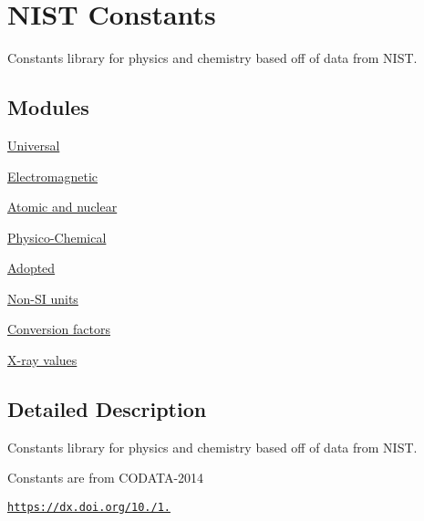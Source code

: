 \hypertarget{group___n_i_s_t_const}{}\section{N\+I\+ST Constants}
\label{group___n_i_s_t_const}


Constants library for physics and chemistry based off of data from N\+I\+ST.  


\subsection*{Modules}
\begin{DoxyCompactItemize}
\item 
\hyperlink{group___universal}{Universal}
\item 
\hyperlink{group___electromagnetic}{Electromagnetic}
\item 
\hyperlink{group___atomic}{Atomic and nuclear}
\item 
\hyperlink{group___physico_chemical}{Physico-\/\+Chemical}
\item 
\hyperlink{group___adopted}{Adopted}
\item 
\hyperlink{group___non-_s_i}{Non-\/\+S\+I units}
\item 
\hyperlink{group___conversion_factors}{Conversion factors}
\item 
\hyperlink{group___x-ray}{X-\/ray values}
\end{DoxyCompactItemize}


\subsection{Detailed Description}
Constants library for physics and chemistry based off of data from N\+I\+ST. 

Constants are from C\+O\+D\+A\+T\+A-\/2014

\href{https://dx.doi.org/10.1063/1.4954402}{\tt https\+://dx.\+doi.\+org/10./1.} 